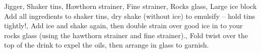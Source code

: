 \documentclass[../main.tex]{subfiles}
\begin{document}
\clearpage
{}

%
{Jigger, Shaker tins, Hawthorn strainer, Fine strainer, Rocks glass, Large ice block}
%
{
	{Add all ingredients to shaker tins, dry shake (without ice) to emulsify -- hold tins tightly!},
	{Add ice and shake again, then double strain over good ice in to your rocks glass}
	(using the hawthorn strainer and fine strainer).,
	{Fold twist over the top of the drink to expel the oils, then arrange in glass to garnish.}
}
\end{document}
